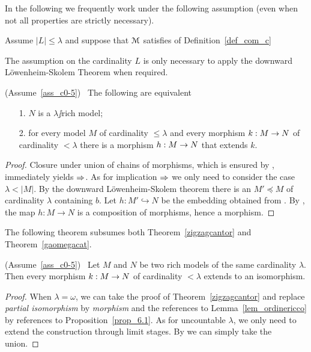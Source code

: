 \documentclass[creche.tex]{subfiles}
\begin{document}
In the following we frequently work under the following assumption (even when not all properties are strictly necessary).
 
\begin{assumption}\label{ass_c0-5}
Assume  $|L|\le\lambda$ and suppose that $\EuScript M$ satisfies  of Definition~\ref{def_com_c}
\end{assumption} 
 
The assumption on the cardinality $L$ is only necessary to apply the downward L\"owenheim-Skolem Theorem when required.

\begin{proposition}\label{prop_6.1}
(Assume~\ref{ass_c0-5})  \  The following are equivalent
\begin{itemize}
\item[1.] $N$ is a $\lambda\jj$rich model;
\item[2.] for every model $M$ of cardinality $\le\lambda$ and every morphism $k:M\rightarrow N$ of cardinality $<\lambda$ there is a morphism $h:M\rightarrow N$ that extends $k$.
\end{itemize}
\end{proposition}
\begin{proof}
Closure under union of chains of morphisms, which is ensured by , immediately yields $\Rightarrow$. As for implication $\Rightarrow$ we only need to consider the case $\lambda<|M|$.  By the downward L\"owenheim-Skolem theorem there is an  $M'\preceq M$ of cardinality $\lambda$ containing $b$. Let $h:M'\hookrightarrow N$ be the embedding obtained from . By , the map  $h:M\to N$ is a composition of morphisms, hence a morphism.
\end{proof}

The following theorem subsumes both Theorem~\ref{zigzagcantor} and Theorem~\ref{gaomegacat}.

\begin{theorem}\label{thm_riccozigzag}
(Assume~\ref{ass_c0-5})  \  Let $M$ and $N$ be two rich models of the same cardinality $\lambda$. Then every morphism $k:M\rightarrow N$ of cardinality $<\lambda$ extends to an isomorphism.
\end{theorem}

\begin{proof}
When $\lambda=\omega$, we can take the proof of Theorem~\ref{zigzagcantor} and replace \textit{partial isomorphism\/} by \textit{morphism\/} and the references to Lemma~\ref{lem_ordinericco} by references to Proposition~\ref{prop_6.1}. As for uncountable $\lambda$, we only need to extend the construction through limit stages. By  we can simply take the union.
\end{proof}
\end{document}
